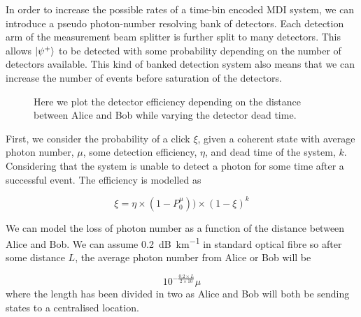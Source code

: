 In order to increase the possible rates of a time-bin encoded \ac{MDI} system, we can introduce a pseudo photon-number resolving bank of detectors. Each detection arm of the measurement beam splitter is further split to many detectors. This allows $\ket{\psi^+}$ to be detected with some probability depending on the number of detectors available. This kind of banked detection system also means that we can increase the number of events before saturation of the detectors. 

\begin{figure}[tbp]
	\caption[Detector efficiency depending on detector dead time]{Here we plot the detector efficiency depending on the distance between Alice and Bob while varying the detector dead time. }
	\label{fig:det_eff_dead_time}
\end{figure}

First, we consider the probability of a click $\xi$, given a coherent state with average photon number, $\mu$, some detection efficiency, $\eta$, and dead time of the system, $k$. Considering that the system is unable to detect a photon for some time after a successful event. The efficiency is modelled as

\begin{equation}
	\xi = \eta \times ( 1 - P^\mu_0) ) \times (1 - \xi)^k
\end{equation}

We can model the loss of photon number as a function of the distance between Alice and Bob. We can assume \SI{0.2}{dB\per\km} in standard optical fibre so after some distance $L$, the average photon number from Alice or Bob will be

\begin{equation}
	10^{-\frac{0.2 \times L}{2 \times 10}} \mu
\end{equation}
where the length has been divided in two as Alice and Bob will both be sending states to a centralised location. 

